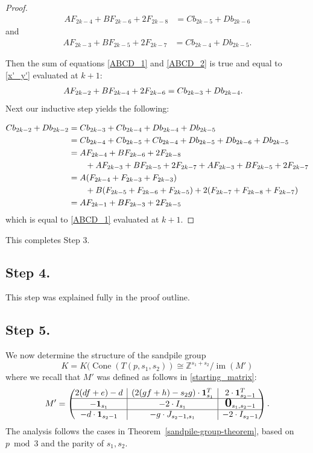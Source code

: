 \documentclass[10pt,reqno]{amsart}
\newcommand{\bigzero}{\mbox{\normalfont\Large\bfseries 0}}
\newcommand{\rvline}{\hspace*{-\arraycolsep}\vline\hspace*{-\arraycolsep}}
\newcommand{\Z}{\mathbb{Z}}
\DeclareMathOperator{\Cone}{Cone}
\DeclareMathOperator{\im}{im}
\def\onesvector{\mathbf{1}}
\begin{document}
\begin{proof}
\begin{align}
 AF_{2k-4}+BF_{2k-6}+2F_{2k-8}
   &=Cb_{2k-5}+Db_{2k-6} \label{ABCD_1}
   \end{align} and 
 \begin{align} 
    AF_{2k-3}+BF_{2k-5}+2F_{2k-7}&=Cb_{2k-4}+Db_{2k-5}.\label{ABCD_2}
\end{align} 

Then the sum of equations \eqref{ABCD_1}  and \eqref{ABCD_2}  is true and equal to  \eqref{x'_y'} evaluated at $k+1:$  
\begin{align}
 AF_{2k-2}+BF_{2k-4}+2F_{2k-6}
   &=Cb_{2k-3}+Db_{2k-4}.\notag
   \end{align}
Next our inductive step yields the following:

\begin{align}
 Cb_{2k-2}+Db_{2k-2}&=Cb_{2k-3}+Cb_{2k-4}+Db_{2k-4}+Db_{2k-5}\notag\\
 &=Cb_{2k-4}+Cb_{2k-5}+Cb_{2k-4}+Db_{2k-5}+Db_{2k-6}+Db_{2k-5}\notag\\
 &=AF_{2k-4}+BF_{2k-6}+2F_{2k-8}\notag\\
 & \qquad +AF_{2k-3}+BF_{2k-5}+2F_{2k-7}+AF_{2k-3}+BF_{2k-5}+2F_{2k-7}\notag\\
 &=A(F_{2k-4} + F_{2k-3}+F_{2k-3})\notag\\
 &\notag 
 \qquad +B(F_{2k-5}+ F_{2k-6} +F_{2k-5})+2(F_{2k-7}+F_{2k-8}+F_{2k-7})\\
 &=AF_{2k-1}+BF_{2k-3}+2F_{2k-5} \notag
   \end{align}
   which is equal to \eqref{ABCD_1} evaluated at $k+1$.
\end{proof}

This completes {\sf Step 3}.

\subsection{Step 4.}
This step was explained fully in the proof outline.

\subsection{Step 5.}

We now determine the structure of the sandpile group 
$$
K=K(\Cone(T(p,s_1,s_2)) \cong \Z^{s_1+s_2}/\im(M')
$$
where we recall that $M'$ was defined  as follows in
\eqref{starting_matrix}:
$$
M'=
\begin{pmatrix*}
2(df+e)-d  & \rvline & (2(gf+h)-s_2g) \cdot \onesvector^T_{s_1} & \rvline & 2\cdot \onesvector^T_{s_2-1} \\
\hline
-\onesvector_{s_1} & \rvline & -2\cdot I_{s_1} & \rvline & \bigzero_{s_1,s_2-1}  \\
\hline
-d\cdot \onesvector_{s_2-1} & \rvline & -g\cdot J_{s_2-1,s_1} & \rvline & -2\cdot I_{s_2-1}
\end{pmatrix*}.
$$
The analysis follows the cases in Theorem~\ref{sandpile-group-theorem},
based on $p \bmod{3}$ and the parity of $s_1, s_2$.
\end{document}
